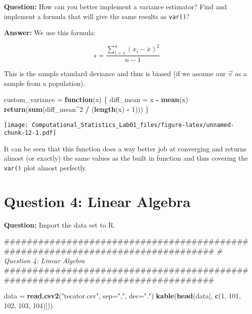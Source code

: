 \documentclass[]{article}
\newenvironment{Shaded}{\begin{snugshade}}{\end{snugshade}}
\newcommand{\KeywordTok}[1]{\textcolor[rgb]{0.13,0.29,0.53}{\textbf{#1}}}
\newcommand{\DataTypeTok}[1]{\textcolor[rgb]{0.13,0.29,0.53}{#1}}
\newcommand{\DecValTok}[1]{\textcolor[rgb]{0.00,0.00,0.81}{#1}}
\newcommand{\StringTok}[1]{\textcolor[rgb]{0.31,0.60,0.02}{#1}}
\newcommand{\CommentTok}[1]{\textcolor[rgb]{0.56,0.35,0.01}{\textit{#1}}}
\newcommand{\ControlFlowTok}[1]{\textcolor[rgb]{0.13,0.29,0.53}{\textbf{#1}}}
\newcommand{\OperatorTok}[1]{\textcolor[rgb]{0.81,0.36,0.00}{\textbf{#1}}}
\newcommand{\NormalTok}[1]{#1}
\begin{document}
\textbf{Question:} How can you better implement a variance estimator?
Find and implement a formula that will give the same results as
\texttt{var()}?

\textbf{Answer:} We use this formula:

\[s = \frac{\sum_{i=1}^{n}(x_i-\overline{x})^2}{n-1}\]

This is the sample standard deviance and thus is biased (if we assume
our \(\vec{v}\) as a sample from a population).

\begin{Shaded}
\begin{Highlighting}[]
\NormalTok{custom_variance =}\StringTok{ }\ControlFlowTok{function}\NormalTok{(x) \{}
\NormalTok{  diff_mean =}\StringTok{ }\NormalTok{x }\OperatorTok{-}\StringTok{ }\KeywordTok{mean}\NormalTok{(x)}
  \KeywordTok{return}\NormalTok{(}\KeywordTok{sum}\NormalTok{(diff_mean}\OperatorTok{^}\DecValTok{2} \OperatorTok{/}\StringTok{ }\NormalTok{(}\KeywordTok{length}\NormalTok{(x) }\OperatorTok{-}\StringTok{ }\DecValTok{1}\NormalTok{)))}
\NormalTok{\}}
\end{Highlighting}
\end{Shaded}

\texttt{[image: Computational\_Statistics\_Lab01\_files/figure-latex/unnamed-chunk-12-1.pdf]}

It can be seen that this function does a way better job at converging
and returns almost (or exactly) the same values as the built in function
and thus covering the \texttt{var()} plot almost perfectly.

\section{Question 4: Linear Algebra}\label{question-4-linear-algebra}

\textbf{Question:} Import the data set to R.

\begin{Shaded}
\begin{Highlighting}[]
\NormalTok{################################################################################}
\CommentTok{# Question 4: Linear Algebra}
\NormalTok{################################################################################}

\NormalTok{data =}\StringTok{ }\KeywordTok{read.csv2}\NormalTok{(}\StringTok{"tecator.csv"}\NormalTok{, }\DataTypeTok{sep=}\StringTok{","}\NormalTok{, }\DataTypeTok{dec=}\StringTok{"."}\NormalTok{)}
\KeywordTok{kable}\NormalTok{(}\KeywordTok{head}\NormalTok{(data[, }\KeywordTok{c}\NormalTok{(}\DecValTok{1}\NormalTok{, }\DecValTok{101}\NormalTok{, }\DecValTok{102}\NormalTok{, }\DecValTok{103}\NormalTok{, }\DecValTok{104}\NormalTok{)]))}
\end{Highlighting}
\end{Shaded}
\end{document}
